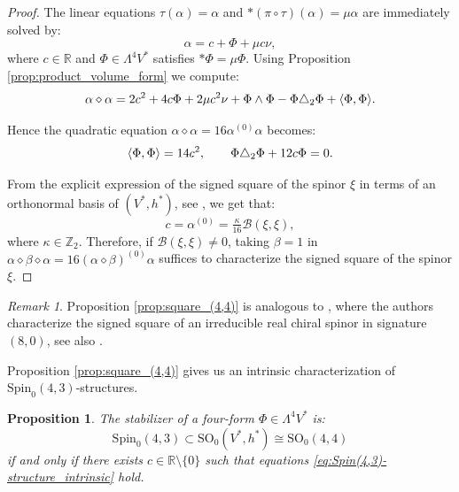 \documentclass[10pt,reqno]{amsart}
\newtheorem{proposition}[theorem]{Proposition}
\theoremstyle{definition}
\theoremstyle{remark}
\newtheorem{remark}[theorem]{Remark}
\newcommand{\Z}{\mathbb{Z}}
\newcommand{\R}{\mathbb{R}}
\DeclarePairedDelimiter{\escal}{\langle}{\rangle}
\begin{document}
\begin{proof}
    The linear equations $\tau(\alpha)=\alpha$ and $*(\pi\circ\tau)(\alpha)=\mu\alpha$ are immediately solved by: $$\alpha=c+\Phi+\mu c\nu,$$ where $c\in\R$ and $\Phi\in\Lambda^4V^*$ satisfies $*\Phi=\mu\Phi$. Using Proposition \ref{prop:product_volume_form} we compute: $$\alpha\diamond\alpha=2c^2+4c\Phi+2\mu c^2\nu+\Phi\wedge\Phi-\Phi\triangle_2\Phi+\escal{\Phi,\Phi}.$$

    Hence the quadratic equation $\alpha\diamond\alpha=16\alpha^{(0)}\alpha$ becomes: $$\escal{\Phi,\Phi}=14c^2,\qquad \Phi\triangle_2\Phi+12c\Phi=0.$$
    
    From the explicit expression of the signed square of the spinor $\xi$ in terms of an orthonormal basis of $(V^*,h^*)$, see \cite[Prop.\ 3.22]{Cortes_Lazaroiu_Shahbazi2021}, we get that: \begin{equation}\label{eq:alpha0_norm_spinor}
        c=\alpha^{(0)}=\tfrac{\kappa}{16}\mathscr{B}(\xi,\xi),
    \end{equation} where $\kappa\in\Z_2$. Therefore, if $\mathscr{B}(\xi,\xi)\neq0$, taking $\beta=1$ in $\alpha\diamond\beta\diamond\alpha=16(\alpha\diamond\beta)^{(0)}\alpha$ suffices to characterize the signed square of the spinor $\xi$.
\end{proof}

\begin{remark}
    Proposition \ref{prop:square_(4,4)} is analogous to \cite[Lemma 3.19]{Lazaroiu_Shahbazi2024}, where the authors characterize the signed square of an irreducible real chiral spinor in signature $(8,0)$, see also \cite{Harvey1990}.
\end{remark}

Proposition \ref{prop:square_(4,4)} gives us an intrinsic characterization of $\mathrm{Spin}_0(4,3)$-structures.

\begin{proposition}\label{prop:Phi_Spin(4,3)}
    The stabilizer of a four-form $\Phi\in\Lambda^4V^*$ is: $$\mathrm{Spin}_0(4,3)\subset\mathrm{SO}_0(V^*,h^*)\cong\mathrm{SO}_0(4,4)$$ if and only if there exists $c\in\R\setminus\{0\}$ such that equations \eqref{eq:Spin(4,3)-structure_intrinsic} hold.
\end{proposition}
\end{document}
